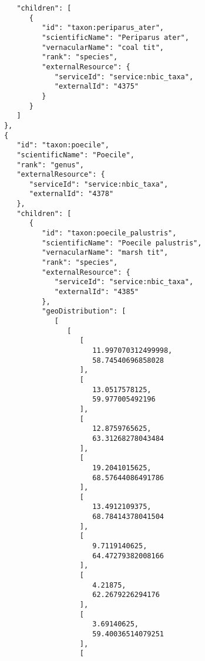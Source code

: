 \documentclass[10pt,letterpaper]{article}
\begin{document}
\begin{verbatim}
               "children": [
                  {
                     "id": "taxon:periparus_ater",
                     "scientificName": "Periparus ater",
                     "vernacularName": "coal tit",
                     "rank": "species",
                     "externalResource": {
                        "serviceId": "service:nbic_taxa",
                        "externalId": "4375"
                     }
                  }
               ]
            },
            {
               "id": "taxon:poecile",
               "scientificName": "Poecile",
               "rank": "genus",
               "externalResource": {
                  "serviceId": "service:nbic_taxa",
                  "externalId": "4378"
               },
               "children": [
                  {
                     "id": "taxon:poecile_palustris",
                     "scientificName": "Poecile palustris",
                     "vernacularName": "marsh tit",
                     "rank": "species",
                     "externalResource": {
                        "serviceId": "service:nbic_taxa",
                        "externalId": "4385"
                     },
                     "geoDistribution": [
                        [
                           [
                              [
                                 11.997070312499998,
                                 58.74540696858028
                              ],
                              [
                                 13.0517578125,
                                 59.977005492196
                              ],
                              [
                                 12.8759765625,
                                 63.31268278043484
                              ],
                              [
                                 19.2041015625,
                                 68.57644086491786
                              ],
                              [
                                 13.4912109375,
                                 68.78414378041504
                              ],
                              [
                                 9.7119140625,
                                 64.47279382008166
                              ],
                              [
                                 4.21875,
                                 62.2679226294176
                              ],
                              [
                                 3.69140625,
                                 59.40036514079251
                              ],
                              [

\end{verbatim}
\end{document}
